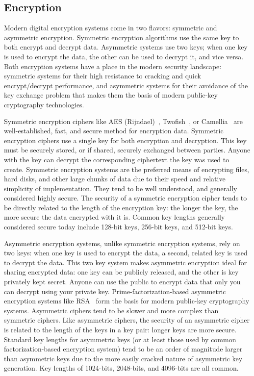 \subsection{Encryption}

Modern digital encryption systems come in two flavors: symmetric and
asymmetric encryption. Symmetric encryption algorithms use the same
key to both encrypt and decrypt data. Asymmetric systems use two keys;
when one key is used to encrypt the data, the other can be used to
decrypt it, and vice versa. Both encryption systems have a place in
the modern security landscape: symmetric systems for their high
resistance to cracking and quick encrypt/decrypt performance, and
asymmetric systems for their avoidance of the key exchange problem
that makes them the basis of modern public-key cryptography
technologies.

Symmetric encryption ciphers like AES (Rijndael)~\cite{Daemen1999},
Twofish~\cite{Schneier1998}, or Camellia~\cite{Matsui2004} are
well-established, fast, and secure method for encryption
data. Symmetric encryption ciphers use a single key for both
encryption and decryption. This key must be securely stored, or if
shared, securely exchanged between parties. Anyone with the key can
decrypt the corresponding ciphertext the key was used to
create. Symmetric encryption systems are the preferred means of
encrypting files, hard disks, and other large chunks of data due to
their speed and relative simplicity of implementation. They tend to be
well understood, and generally considered highly secure. The security
of a symmetric encryption cipher tends to be directly related to the
length of the encryption key: the longer the key, the more secure the
data encrypted with it is. Common key lengths generally considered
secure today include 128-bit keys, 256-bit keys, and 512-bit keys.

Asymmetric encryption systems, unlike symmetric encryption systems,
rely on two keys: when one key is used to encrypt the data, a second,
related key is used to decrypt the data. This two key system makes
asymmetric encryption ideal for sharing encrypted data: one key can be
publicly released, and the other is key privately kept secret. Anyone
can use the public to encrypt data that only you can decrypt using
your private key. Prime-factorization-based asymmetric encryption
systems like RSA~\cite{Rivest1978} form the basis for modern
public-key cryptography systems. Asymmetric ciphers tend to be slower
and more complex than symmetric ciphers. Like asymmetric ciphers, the
security of an asymmetric cipher is related to the length of the keys
in a key pair: longer keys are more secure. Standard key lengths for
asymmetric keys (or at least those used by common factorization-based
encryption system) tend to be an order of magnitude larger than
asymmetric keys due to the more easily cracked nature of asymmetric
key generation. Key lengths of 1024-bits, 2048-bits, and 4096-bits are
all common.

